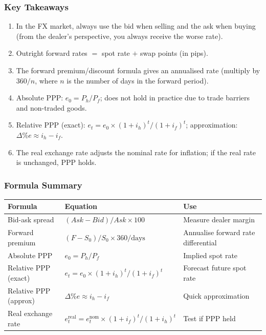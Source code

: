\documentclass[11pt,a4paper]{article}
\begin{document}
\subsubsection*{Key Takeaways}
\begin{enumerate}
  \item In the FX market, always use the bid when selling and the ask when buying (from the dealer's perspective, you always receive the worse rate).
  \item Outright forward rates $=$ spot rate $+$ swap points (in pips).
  \item The forward premium/discount formula gives an annualised rate (multiply by $360/n$, where $n$ is the number of days in the forward period).
  \item Absolute PPP: $e_0 = P_h / P_f$; does not hold in practice due to trade barriers and non-traded goods.
  \item Relative PPP (exact): $e_t = e_0 \times (1+i_h)^t/(1+i_f)^t$; approximation: $\Delta\% e \approx i_h - i_f$.
  \item The real exchange rate adjusts the nominal rate for inflation; if the real rate is unchanged, PPP holds.
\end{enumerate}

\subsubsection*{Formula Summary}
\begin{center}
\begin{tabular}{lp{5.2cm}p{4.2cm}}
\toprule
\textbf{Formula} & \textbf{Equation} & \textbf{Use} \\
\midrule
Bid-ask spread & $(Ask - Bid)/Ask \times 100$ & Measure dealer margin \\
Forward premium & $(F - S_0)/S_0 \times 360/\text{days}$ & Annualise forward rate differential \\
Absolute PPP & $e_0 = P_h/P_f$ & Implied spot rate \\
Relative PPP (exact) & $e_t = e_0 \times (1+i_h)^t/(1+i_f)^t$ & Forecast future spot rate \\
Relative PPP (approx) & $\Delta\% e \approx i_h - i_f$ & Quick approximation \\
Real exchange rate & $e_t^{\text{real}} = e_t^{\text{nom}} \times (1+i_f)^t/(1+i_h)^t$ & Test if PPP held \\
\bottomrule
\end{tabular}
\end{center}
\end{document}
